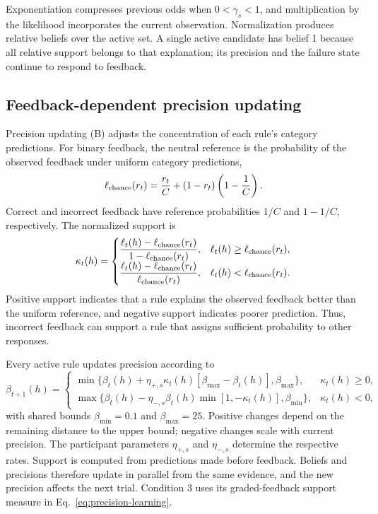Exponentiation compresses previous odds when $0<\gamma_s<1$, and multiplication by the likelihood incorporates the current observation. Normalization produces relative beliefs over the active set. A single active candidate has belief 1 because all relative support belongs to that explanation; its precision and the failure state continue to respond to feedback.

\subsection*{Feedback-dependent precision updating}
\label{m:precision}

Precision updating (B) adjusts the concentration of each rule's category predictions. For binary feedback, the neutral reference is the probability of the observed feedback under uniform category predictions,
\begin{equation}
\ell_{\rm chance}(r_t)=\frac{r_t}{C}+(1-r_t)\left(1-\frac1C\right).
\label{eq:binary-chance}
\end{equation}
Correct and incorrect feedback have reference probabilities $1/C$ and $1-1/C$, respectively. The normalized support is
\begin{equation}
\kappa_t(h)=
\begin{cases}
\dfrac{\ell_t(h)-\ell_{\rm chance}(r_t)}{1-\ell_{\rm chance}(r_t)},
&\ell_t(h)\geq\ell_{\rm chance}(r_t),\\[5pt]
\dfrac{\ell_t(h)-\ell_{\rm chance}(r_t)}{\ell_{\rm chance}(r_t)},
&\ell_t(h)<\ell_{\rm chance}(r_t).
\end{cases}
\label{eq:binary-support}
\end{equation}
Positive support indicates that a rule explains the observed feedback better than the uniform reference, and negative support indicates poorer prediction. Thus, incorrect feedback can support a rule that assigns sufficient probability to other responses.

Every active rule updates precision according to
\begin{equation}
\beta_{t+1}(h)=
\begin{cases}
\min\{\beta_t(h)+\eta_{+,s}\kappa_t(h)[\beta_{\max}-\beta_t(h)],\beta_{\max}\},
&\kappa_t(h)\geq0,\\[4pt]
\max\{\beta_t(h)-\eta_{-,s}\beta_t(h)\min[1,-\kappa_t(h)],\beta_{\min}\},
&\kappa_t(h)<0,
\end{cases}
\label{eq:precision-learning}
\end{equation}
with shared bounds $\beta_{\min}=0.1$ and $\beta_{\max}=25$. Positive changes depend on the remaining distance to the upper bound; negative changes scale with current precision. The participant parameters $\eta_{+,s}$ and $\eta_{-,s}$ determine the respective rates. Support is computed from predictions made before feedback. Beliefs and precisions therefore update in parallel from the same evidence, and the new precision affects the next trial. Condition 3 uses its graded-feedback support measure in Eq.~\ref{eq:precision-learning}.

